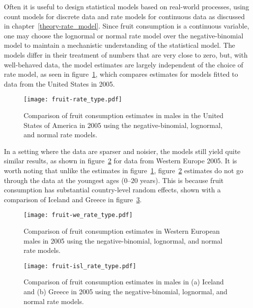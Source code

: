 Often it is useful to design statistical models based on real-world
processes, using count models for discrete data and rate models for
continuous data as discussed in chapter~\ref{theory-rate_model}.
Since fruit consumption is a continuous variable, one may choose the
lognormal or normal rate model over the negative-binomial model to
maintain a mechanistic understanding of the statistical model.  The
models differ in their treatment of numbers that are very close to
zero, but, with well-behaved data, the model estimates are largely
independent of the choice of rate model, as seen in
figure~\ref{fig:app-fruit rate type}, which compares estimates for
models fitted to data from the United States in 2005.

    \begin{figure}[h]
        \begin{center}
            \texttt{[image: fruit-rate\_type.pdf]}
            \caption{Comparison of fruit consumption estimates in
              males in the United States of America in 2005 using the
              negative-binomial, lognormal, and normal rate models.}
            \label{fig:app-fruit rate type}
        \end{center}
    \end{figure}

In a setting where the data are sparser and noisier, the
models still yield quite similar results, as shown in figure~\ref{fig:app-fruit europe}
for data from Western Europe 2005.  It is worth noting that unlike
the estimates in figure~\ref{fig:app-fruit rate type},
figure~\ref{fig:app-fruit europe} estimates do not go through the
data at the youngest ages ($0$--$20$ years).  This is because fruit consumption has
substantial country-level random effects, shown with a comparison of
Iceland and Greece in figure~\ref{fig:app-fruit countries}.

    \begin{figure}[h]
        \begin{center}
            \texttt{[image: fruit-we\_rate\_type.pdf]}
            \caption{Comparison of fruit consumption estimates in
              Western European males in 2005 using the
              negative-binomial, lognormal, and normal rate models.}
            \label{fig:app-fruit europe}
        \end{center}
    \end{figure}

    \begin{figure}[h]
        \begin{center}
            \texttt{[image: fruit-isl\_rate\_type.pdf]}
            \caption{Comparison of fruit consumption estimates in males in
              (a) Iceland and (b) Greece in 2005 using the
              negative-binomial, lognormal, and normal rate models.}
            \label{fig:app-fruit countries}
        \end{center}
    \end{figure}

